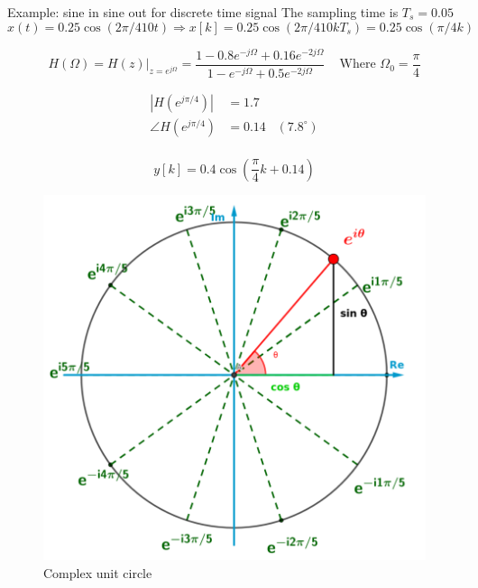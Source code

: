 \newpage
\begin{exampleblock}{Example: sine in sine out for discrete time signal}
    The sampling time is $T_s = 0.05$ 
    \begin{equation*}
        x(t) = 0.25\cos(2\pi/4 10 t) \Rightarrow x[k] = 0.25\cos(2\pi/4 10 k T_s) = 0.25\cos(\pi/4 k)
    \end{equation*}

    \begin{equation*}
        H(\Omega) = H(z)|_{z=e^{j\Omega}} = \frac{ 1 -0.8e^{-j\Omega} +0.16e^{-2j\Omega} }{ 1 -e^{-j\Omega} +0.5e^{-2j\Omega} } \;\;\; \text{ Where } \Omega_0 = \frac{\pi}{4}
    \end{equation*}

    \begin{align*}
        |H(e^{j\pi/4})| &= 1.7  \\
        \angle H(e^{j\pi/4}) &= 0.14 \;\;\; (7.8^{\circ}) \\
    \end{align*}

    \begin{equation*}
        y[k] = 0.4\cos(\frac{\pi}{4}k + 0.14)
    \end{equation*}
\end{exampleblock}
    


\newpage
\begin{appendices}

\begin{figure}[!h]
   \centering
   \includegraphics[width=12cm]{image/complex_unit_circle.png} 
   \caption{Complex unit circle}
   \label{fig:complex_unit_circle}
\end{figure}
\end{appendices}

